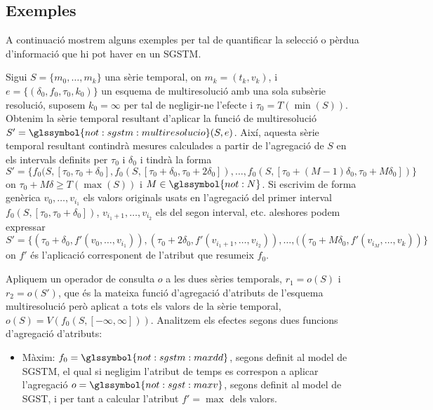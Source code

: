 \subsection{Exemples}

A continuació mostrem alguns exemples per tal de quantificar la
selecció o pèrdua d'informació que hi pot haver en un \gls{SGSTM}.


\begin{example}
  \label{ex:multiresolucio:f=op}
  Sigui $S=\{m_0,\dotsc,m_k\}$ una sèrie temporal, on $m_k=(t_k,v_k)$,
  i $e= \{ (\delta_0, f_0, \tau_0, k_0) \}$ un esquema de
  multiresolució amb una sola subsèrie resolució, suposem $k_0=\infty$
  per tal de negligir-ne l'efecte i $\tau_0=T(\min(S))$. Obtenim la
  sèrie temporal resultant d'aplicar la funció de multiresolució
  $S'=\glssymbol{not:sgstm:multiresolucio}(S,e)$.  Així, aquesta sèrie
  temporal resultant contindrà mesures calculades a partir de
  l'agregació de $S$ en els intervals definits per $\tau_0$ i
  $\delta_0$ i tindrà la forma $S'=\{ f_0(S,[\tau_0,\tau_0+\delta_0],
  f_0(S,[\tau_0+\delta_0,\tau_0+2\delta_0]),\dotsc,
  f_0(S,[\tau_0+(M-1)\delta_0,\tau_0+M\delta_0])\}$ on
  $\tau_0+M\delta\geq T(\max(S))$ i $M\in\glssymbol{not:N}$. Si
  escrivim de forma genèrica $v_0,\dotsc,v_{i_1}$ els valors originals
  usats en l'agregació del primer interval
  $f_0(S,[\tau_0,\tau_0+\delta_0])$, $v_{i_1+1},\dotsc,v_{i_2}$ els del
  segon interval, etc. aleshores podem expressar $S'=\{
  (\tau_0+\delta_0, f'(v_0,\dotsc,v_{i_1})), (\tau_0+2\delta_0,
  f'(v_{i_1+1},\dotsc,v_{i_2})), \dotsc, ((\tau_0+M\delta_0 ,f'(v_{i_M},
  \dotsc, v_k)) \}$ on $f'$ és l'aplicació corresponent de l'atribut
  que resumeix $f_0$.

  Apliquem un operador de consulta $o$ a les dues sèries temporals,
  $r_1=o(S)$ i $r_2=o(S')$, que és la mateixa funció d'agregació
  d'atributs de l'esquema multiresolució però aplicat a tots els
  valors de la sèrie temporal,
  $o(S)=V(f_0(S,[-\infty,\infty]))$. Analitzem els efectes segons dues
  funcions d'agregació d'atributs:

  \begin{itemize}
  \item Màxim: $f_0=\glssymbol{not:sgstm:maxdd}$, segons definit al
    model de \gls{SGSTM}, el qual si negligim l'atribut de temps es
    correspon a aplicar l'agregació $o=\glssymbol{not:sgst:maxv}$,
    segons definit al model de \gls{SGST}, i per tant a calcular
    l'atribut $f'=\max$ dels valors.


\end{itemize}
\end{example}
